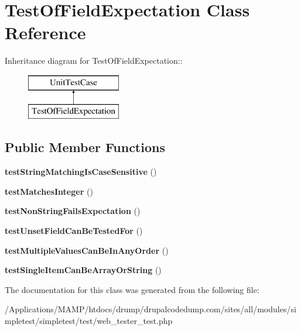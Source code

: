 \hypertarget{class_test_of_field_expectation}{
\section{TestOfFieldExpectation Class Reference}
\label{class_test_of_field_expectation}
}
Inheritance diagram for TestOfFieldExpectation::\begin{figure}[H]
\begin{center}
\leavevmode
\includegraphics[height=2cm]{class_test_of_field_expectation}
\end{center}
\end{figure}
\subsection*{Public Member Functions}
\begin{DoxyCompactItemize}
\item 
\hypertarget{class_test_of_field_expectation_a9b3890fcf6496c5709776e0ae1e46b0b}{
{\bfseries testStringMatchingIsCaseSensitive} ()}
\label{class_test_of_field_expectation_a9b3890fcf6496c5709776e0ae1e46b0b}

\item 
\hypertarget{class_test_of_field_expectation_ab767d3e11a7d3852b7e9c3e96db67818}{
{\bfseries testMatchesInteger} ()}
\label{class_test_of_field_expectation_ab767d3e11a7d3852b7e9c3e96db67818}

\item 
\hypertarget{class_test_of_field_expectation_a0dcaa97119bb1a60007394e35a700af6}{
{\bfseries testNonStringFailsExpectation} ()}
\label{class_test_of_field_expectation_a0dcaa97119bb1a60007394e35a700af6}

\item 
\hypertarget{class_test_of_field_expectation_a73b9c8f0f1eb0e3ed10c0066fc4d5823}{
{\bfseries testUnsetFieldCanBeTestedFor} ()}
\label{class_test_of_field_expectation_a73b9c8f0f1eb0e3ed10c0066fc4d5823}

\item 
\hypertarget{class_test_of_field_expectation_ad710288904a016d0426effc7d8a35e16}{
{\bfseries testMultipleValuesCanBeInAnyOrder} ()}
\label{class_test_of_field_expectation_ad710288904a016d0426effc7d8a35e16}

\item 
\hypertarget{class_test_of_field_expectation_a33be788485cae7065336de1cdd8acb72}{
{\bfseries testSingleItemCanBeArrayOrString} ()}
\label{class_test_of_field_expectation_a33be788485cae7065336de1cdd8acb72}

\end{DoxyCompactItemize}


The documentation for this class was generated from the following file:\begin{DoxyCompactItemize}
\item 
/Applications/MAMP/htdocs/drump/drupalcodedump.com/sites/all/modules/simpletest/simpletest/test/web\_\-tester\_\-test.php\end{DoxyCompactItemize}
